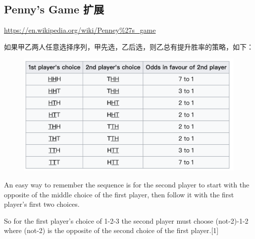 \documentclass[12pt]{article}
\begin{document}
\subsection{Penny's Game 扩展}
\url{https://en.wikipedia.org/wiki/Penney%27s_game}

如果甲乙两人任意选择序列，甲先选，乙后选，则乙总有提升胜率的策略，如下：
\begin{figure}[H]
    \centering
    \includegraphics[width=.8\textwidth]{fig/Probability_Penny_Game.png}
\end{figure}

An easy way to remember the sequence is for the second player to start with the opposite of the middle choice of the first player, then follow it with the first player's first two choices.

So for the first player's choice of 1-2-3
the second player must choose (not-2)-1-2
where (not-2) is the opposite of the second choice of the first player.[1]



\end{document}
